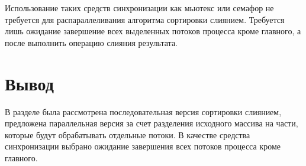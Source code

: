 Использование таких средств синхронизации как мьютекс или семафор не требуется для распараллеливания алгоритма сортировки слиянием. Требуется лишь ожидание завершение всех выделенных потоков процесса кроме главного, а после выполнить операцию слияния результата.

\section*{Вывод}
В разделе была рассмотрена последовательная версия сортировки слиянием, предложена параллельная версия за счет разделения исходного массива на части, которые будут обрабатывать отдельные потоки. В качестве средства синхронизации выбрано ожидание завершения всех потоков процесса кроме главного.